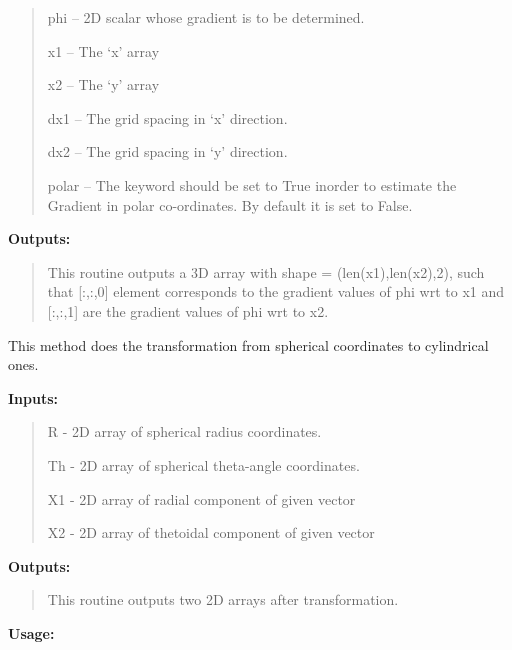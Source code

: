 \documentclass[letterpaper,10pt,english]{sphinxmanual}
\begin{document}
\begin{fulllineitems}
\begin{fulllineitems}
\begin{quote}
phi -- 2D scalar whose gradient is to be determined.

x1 -- The `x' array

x2 -- The `y' array

dx1 -- The grid spacing in `x' direction.

dx2 -- The grid spacing in `y' direction.

polar -- The keyword should be set to True inorder to estimate the Gradient in polar co-ordinates. By default it is set to False.
\end{quote}

\textbf{Outputs:}
\begin{quote}

This routine outputs a 3D array with shape = (len(x1),len(x2),2), such that {[}:,:,0{]} element corresponds to the gradient values of phi wrt to x1 and {[}:,:,1{]} are the gradient values of phi wrt to x2.
\end{quote}

\end{fulllineitems}


\begin{fulllineitems}
\label{tools:pyPLUTO.Tools.RTh2Cyl}
This method does the transformation from spherical coordinates to cylindrical ones.

\textbf{Inputs:}
\begin{quote}

R - 2D array of spherical radius coordinates.

Th - 2D array of spherical theta-angle coordinates.

X1 - 2D array of radial component of given vector

X2 - 2D array of thetoidal component of given vector
\end{quote}

\textbf{Outputs:}
\begin{quote}

This routine outputs two 2D arrays after transformation.
\end{quote}

\textbf{Usage:}
\begin{quote}





\end{quote}
\end{fulllineitems}
\end{fulllineitems}
\end{document}
